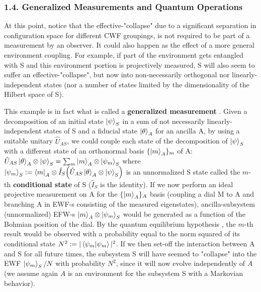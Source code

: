 \documentclass[11pt, a4paper]{article} %
\begin{document}
\subsubsection*{1.4. Generalized Measurements and Quantum Operations}\vspace{-0.1cm}
At this point, notice that the effective-"collapse" due to a significant separation in configuration space for different CWF groupings, is not required to be part of a measurement by an observer. It could also happen as the effect of a more general environment coupling. 
For example, if part of the environment gets entangled with S and this environment portion is projectively measured, S will also seem to suffer an effective-"collapse", but now into non-necessarily orthogonal nor linearly-independent states (nor a number of states limited by the dimensionality of the Hilbert space of S). 

This example is in fact what is called a {\bf generalized measurement} \cite{Generalized, Durr}. Given a decomposition of an initial state $\ket{\psi}_S$ in a sum of not necessarily linearly-independent states of S and a fiducial state $\ket{\theta}_A$ for an ancilla A, by using a suitable unitary $\hat{U}_{AS}$, we could couple each state of the decomposition of $\ket{\psi}_S$ with a different state of an orthonormal basis $\{\ket{m}_A\}_m$ of A: $\hat{U}_{AS}\ket{\theta}_A\otimes\ket{\psi}_S=\sum_m \ket{m}_A\otimes \ket{\psi_m}_S$ where $\ket{\psi_m}_S:=\bra{m}_A\otimes\hat{I}_S \qty(\hat{U}_{AS}\ket{\theta}_A\otimes\ket{\psi}_S)$ is an unnormalized S state called the $m$-th {\bf conditional state} of S ($\hat{I}_S$ is the identity). If we now perform an ideal projective measurement on A for the $\{\ket{m}_A\}_A$ basis (coupling a dial M to A and branching A in EWF-s consisting of the measured eigenstates), ancilla-subsystem (unnormalized) EFW-s $\ket{m}_A\otimes \ket{\psi_m}_S$ would be generated as a function of the Bohmian position of the dial. By the quantum equilibrium hypothesis \cite{Absolute}, the $m$-th result would be observed with a probability equal to the norm squared of its conditional state $N^2:=|\bra{\psi_m}\ket{\psi_m}|^2$. If we then set-off the interaction between A and S for all future times, the subsystem S will have seemed to "collapse" into the EWF $\ket{\psi_m}_S/N$ with probability $N^2$, since it will now evolve independently of $A$ (we assume again $A$ is an environment for the subsystem S with a Markovian behavior).
\end{document}
